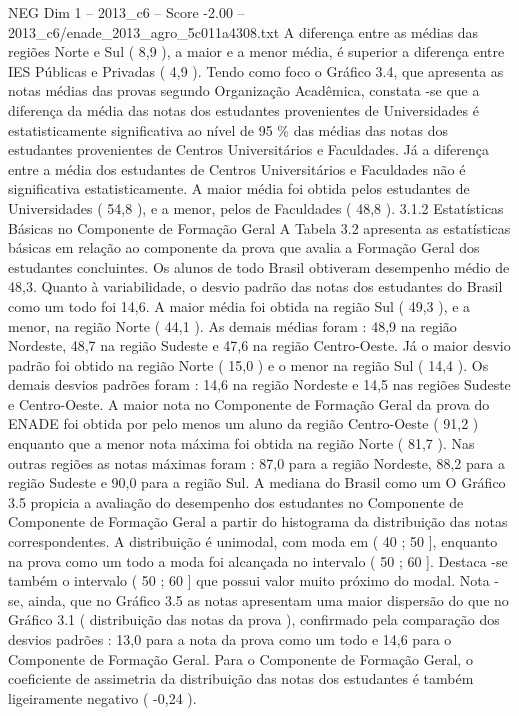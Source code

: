 \begin{textsample}{NEG Dim 1 – 2013\_c6 – Score -2.00 – 2013\_c6/enade\_2013\_agro\_5c011a4308.txt}
A diferença entre as médias das regiões Norte e Sul ( 8,9 ), a maior e a menor média, é superior a diferença entre IES Públicas e Privadas ( 4,9 ).
Tendo como foco o Gráfico 3.4, que apresenta as notas médias das provas segundo Organização Acadêmica, constata -se que a diferença da média das notas dos estudantes provenientes de Universidades é estatisticamente significativa ao nível de 95 \% das médias das notas dos estudantes provenientes de Centros Universitários e Faculdades.
Já a diferença entre a média dos estudantes de Centros Universitários e Faculdades não é significativa estatisticamente.
A maior média foi obtida pelos estudantes de Universidades ( 54,8 ), e a menor, pelos de Faculdades ( 48,8 ). 3.1.2 Estatísticas Básicas no Componente de Formação Geral A Tabela 3.2 apresenta as estatísticas básicas em relação ao componente da prova que avalia a Formação Geral dos estudantes concluintes.
Os alunos de todo Brasil obtiveram desempenho médio de 48,3.
Quanto à variabilidade, o desvio padrão das notas dos estudantes do Brasil como um todo foi 14,6.
A maior média foi obtida na região Sul ( 49,3 ), e a menor, na região Norte ( 44,1 ).
As demais médias foram : 48,9 na região Nordeste, 48,7 na região Sudeste e 47,6 na região Centro-Oeste.
Já o maior desvio padrão foi obtido na região Norte ( 15,0 ) e o menor na região Sul ( 14,4 ).
Os demais desvios padrões foram : 14,6 na região Nordeste e 14,5 nas regiões Sudeste e Centro-Oeste.
A maior nota no Componente de Formação Geral da prova do ENADE foi obtida por pelo menos um aluno da região Centro-Oeste ( 91,2 ) enquanto que a menor nota máxima foi obtida na região Norte ( 81,7 ).
Nas outras regiões as notas máximas foram : 87,0 para a região Nordeste, 88,2 para a região Sudeste e 90,0 para a região Sul.
A mediana do Brasil como um O Gráfico 3.5 propicia a avaliação do desempenho dos estudantes no Componente de Componente de Formação Geral a partir do histograma da distribuição das notas correspondentes.
A distribuição é unimodal, com moda em ( 40 ; 50 ], enquanto na prova como um todo a moda foi alcançada no intervalo ( 50 ; 60 ].
Destaca -se também o intervalo ( 50 ; 60 ] que possui valor muito próximo do modal.
Nota -se, ainda, que no Gráfico 3.5 as notas apresentam uma maior dispersão do que no Gráfico 3.1 ( distribuição das notas da prova ), confirmado pela comparação dos desvios padrões : 13,0 para a nota da prova como um todo e 14,6 para o Componente de Formação Geral.
Para o Componente de Formação Geral, o coeficiente de assimetria da distribuição das notas dos estudantes é também ligeiramente negativo ( -0,24 ).

\end{textsample}
